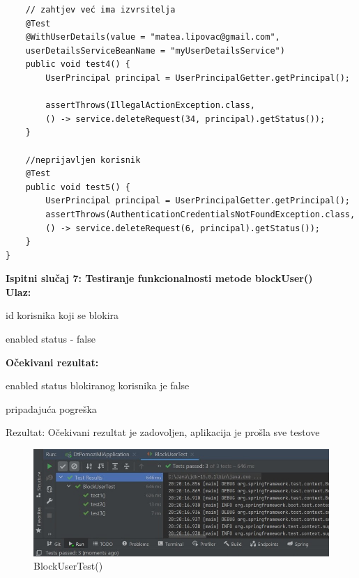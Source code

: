 \begin{verbatim}
	// zahtjev već ima izvrsitelja
	@Test
	@WithUserDetails(value = "matea.lipovac@gmail.com",
	userDetailsServiceBeanName = "myUserDetailsService")
	public void test4() {
		UserPrincipal principal = UserPrincipalGetter.getPrincipal();

		assertThrows(IllegalActionException.class, 
		() -> service.deleteRequest(34, principal).getStatus());
	}

	//neprijavljen korisnik
	@Test
	public void test5() {
		UserPrincipal principal = UserPrincipalGetter.getPrincipal();
		assertThrows(AuthenticationCredentialsNotFoundException.class, 
		() -> service.deleteRequest(6, principal).getStatus());
	}
}
            \end{verbatim}
            
            \medskip
			
			\noindent \textbf{Ispitni slučaj 7: Testiranje funkcionalnosti metode blockUser()}\\
			
			\medskip
            \noindent\textbf{Ulaz:}
            \begin{packed_enum}
            \item id korisnika koji se blokira
            \item enabled status - false
            \end{packed_enum}
            
            \noindent\textbf{Očekivani rezultat:}
            \begin{packed_enum}
            \item enabled status blokiranog korisnika je false
            \item pripadajuća pogreška
            \end{packed_enum}
            
            \noindent \text
            Rezultat: Očekivani rezultat je zadovoljen, aplikacija je prošla sve testove \\
            
            \begin{figure}[H]
                 \includegraphics[width=\textwidth, height=\textheight, keepaspectratio]{slike/BlockUserTest.jpeg}
                \centering
                \caption{BlockUserTest()}
            \end{figure}
            
